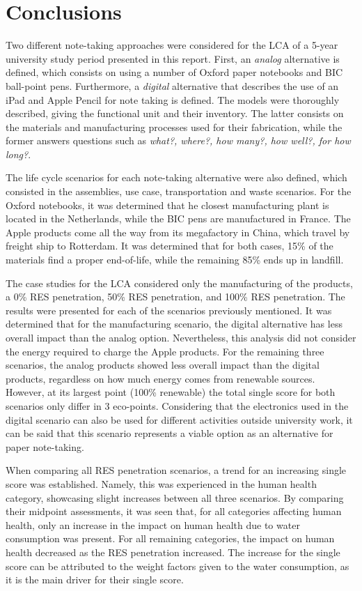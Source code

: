 \section{Conclusions}\label{sec:conclusions}

Two different note-taking approaches were considered for the LCA of a 5-year university study period presented in this report. First, an \textit{analog} alternative is defined, which consists on using a number of Oxford paper notebooks and BIC ball-point pens. Furthermore, a \textit{digital} alternative that describes the use of an iPad and Apple Pencil for note taking is defined. The models were thoroughly described, giving the functional unit and their inventory. The latter consists on the materials and manufacturing processes used for their fabrication, while the former answers questions such as \textit{what?, where?, how many?, how well?, for how long?}. 

The life cycle scenarios for each note-taking alternative were also defined, which consisted in the assemblies, use case, transportation and waste scenarios. For the Oxford notebooks, it was determined that he closest manufacturing plant is located in the Netherlands, while the BIC pens are manufactured in France. The Apple products come all the way from its megafactory in China, which travel by freight ship to Rotterdam. It was determined that for both cases, 15\% of the materials find a proper end-of-life, while the remaining 85\% ends up in landfill. 

The case studies for the LCA considered only the manufacturing of the products, a 0\% RES penetration, 50\% RES penetration, and 100\% RES penetration. The results were presented for each of the scenarios previously mentioned. It was determined that for the manufacturing scenario, the digital alternative has less overall impact than the analog option. Nevertheless, this analysis did not consider the energy required to charge the Apple products. For the remaining three scenarios, the analog products showed less overall impact than the digital products, regardless on how much energy comes from renewable sources. However, at its largest point (100\% renewable) the total single score for both scenarios only differ in 3 eco-points. Considering that the electronics used in the digital scenario can also be used for different activities outside university work, it can be said that this scenario represents a viable option as an alternative for paper note-taking.

When comparing all RES penetration scenarios, a trend for an increasing single score was established. Namely, this was experienced in the human health category, showcasing slight increases between all three scenarios. By comparing their midpoint assessments, it was seen that, for all categories affecting human health, only an increase in the impact on human health due to water consumption was present. For all remaining categories, the impact on human health decreased as the RES penetration increased. The increase for the single score can be attributed to the weight factors given to the water consumption, as it is the main driver for their single score.